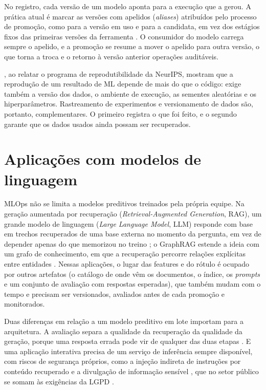 No registro, cada versão de um modelo aponta para a execução que a gerou. A prática atual é marcar as versões com apelidos (\textit{aliases}) atribuídos pelo processo de promoção, como  para a versão em uso e  para a candidata, em vez dos estágios fixos das primeiras versões da ferramenta \cite{mlflowdocs}. O consumidor do modelo carrega sempre o apelido, e a promoção se resume a mover o apelido para outra versão, o que torna a troca e o retorno à versão anterior operações auditáveis.

, ao relatar o programa de reprodutibilidade da NeurIPS, mostram que a reprodução de um resultado de ML depende de mais do que o código: exige também a versão dos dados, o ambiente de execução, as sementes aleatórias e os hiperparâmetros. Rastreamento de experimentos e versionamento de dados são, portanto, complementares. O primeiro registra o que foi feito, e o segundo garante que os dados usados ainda possam ser recuperados.

\section{Aplicações com modelos de linguagem}
\label{sec:llm}

MLOps não se limita a modelos preditivos treinados pela própria equipe. Na geração aumentada por recuperação (\textit{Retrieval-Augmented Generation}, RAG), um grande modelo de linguagem (\textit{Large Language Model}, LLM) responde com base em trechos recuperados de uma base externa no momento da pergunta, em vez de depender apenas do que memorizou no treino \cite{lewis2020rag}; o GraphRAG estende a ideia com um grafo de conhecimento, em que a recuperação percorre relações explícitas entre entidades \cite{edge2024graphrag}. Nessas aplicações, o lugar das features e do rótulo é ocupado por outros artefatos (o catálogo de onde vêm os documentos, o índice, os \textit{prompts} e um conjunto de avaliação com respostas esperadas), que também mudam com o tempo e precisam ser versionados, avaliados antes de cada promoção e monitorados.

Duas diferenças em relação a um modelo preditivo em lote importam para a arquitetura. A avaliação separa a qualidade da recuperação da qualidade da geração, porque uma resposta errada pode vir de qualquer das duas etapas \cite{es2024ragas}. E uma aplicação interativa precisa de um serviço de inferência sempre disponível, com riscos de segurança próprios, como a injeção indireta de instruções por conteúdo recuperado \cite{greshake2023} e a divulgação de informação sensível \cite{owasp2025llm}, que no setor público se somam às exigências da LGPD \cite{brasil2018lgpd}.

